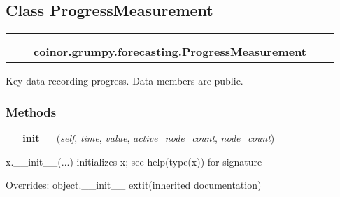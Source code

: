 
\subsection{Class ProgressMeasurement}

    \label{coinor:grumpy:forecasting:ProgressMeasurement}
\begin{tabular}{cccccc}
\multicolumn{2}{r}{\settowidth{\BCL}{object}\multirow{2}{\BCL}{object}}
&&
  \\\cline{3-3}
  &&\multicolumn{1}{c|}{}
&&
  \\
&&\multicolumn{2}{l}{\textbf{coinor.grumpy.forecasting.ProgressMeasurement}}
\end{tabular}

Key data recording progress.  Data members are public.



  \subsubsection{Methods}

    \vspace{0.5ex}

\hspace{.8\funcindent}\begin{boxedminipage}{\funcwidth}

    \raggedright \textbf{\_\_init\_\_}(\textit{self}, \textit{time}, \textit{value}, \textit{active\_node\_count}, \textit{node\_count})

\setlength{\parskip}{2ex}
    x.\_\_init\_\_(...) initializes x; see help(type(x)) for signature

\setlength{\parskip}{1ex}
      Overrides: object.\_\_init\_\_ 	extit{(inherited documentation)}

    \end{boxedminipage}


